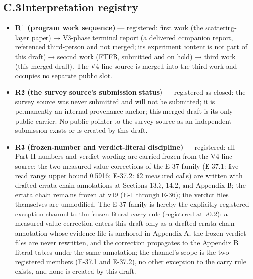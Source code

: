 \documentclass[11pt]{article}
\begin{document}
\subsection*{C.3\quad Interpretation registry}
\begin{itemize}[leftmargin=1.6em,itemsep=2pt,parsep=0pt,topsep=3pt]
\item \textbf{R1 (program work sequence)} — registered: first work (the scattering-layer paper) → V3-phase terminal report (a delivered companion report, referenced third-person and not merged; its experiment content is not part of this draft) → second work (FTFB, submitted and on hold) → third work (this merged draft). The V4-line source is merged into the third work and occupies no separate public slot.
\item \textbf{R2 (the survey source's submission status)} — registered as closed: the survey source was never submitted and will not be submitted; it is permanently an internal provenance anchor; this merged draft is its only public carrier. No public pointer to the survey source as an independent submission exists or is created by this draft.
\item \textbf{R3 (frozen-number and verdict-literal discipline)} — registered: all Part II numbers and verdict wording are carried frozen from the V4-line source; the two measured-value corrections of the E-37 family (E-37.1: five-read range upper bound 0.5916; E-37.2: 62 measured calls) are written with drafted errata-chain annotations at Sections 13.3, 14.2, and Appendix B; the errata chain remains frozen at v19 (E-1 through E-36); the verdict files themselves are unmodified. The E-37 family is hereby the explicitly registered exception channel to the frozen-literal carry rule (registered at v0.2): a measured-value correction enters this draft only as a drafted errata-chain annotation whose evidence file is anchored in Appendix A, the frozen verdict files are never rewritten, and the correction propagates to the Appendix B literal tables under the same annotation; the channel's scope is the two registered members (E-37.1 and E-37.2), no other exception to the carry rule exists, and none is created by this draft.

\end{itemize}
\end{document}
